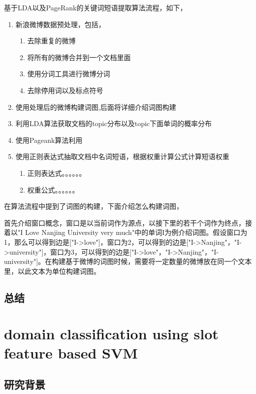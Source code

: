 \documentclass[master]{njuthesis}
\begin{document}
    基于LDA以及PageRank的关键词短语提取算法流程，如下，
    \begin{enumerate}
       \item 新浪微博数据预处理，包括，
	 \begin{enumerate}
	    \item 去除重复的微博
	    \item 将所有的微博合并到一个文档里面
	    \item 使用分词工具进行微博分词
	    \item 去除停用词以及标点符号
         \end{enumerate}
       \item 使用处理后的微博构建词图,后面将详细介绍词图构建
       \item 利用LDA算法获取文档的topic分布以及topic下面单词的概率分布
       \item 使用Pageank算法利用
       \item 使用正则表达式抽取文档中名词短语，根据权重计算公式计算短语权重
	 \begin{enumerate}
	   \item 正则表达式。。。。。。
	   \item 权重公式。。。。。。
         \end{enumerate}
    \end{enumerate}
    
    在算法流程中提到了词图的构建，下面介绍怎么构建词图，

    首先介绍窗口概念，窗口是以当前词作为源点，以接下里的若干个词作为终点，接着以"I Love Nanjing University very much"中的单词I为例介绍词图。假设窗口为1，那么可以得到边是["I->love"]，窗口为2，可以得到的边是["I->Nanjing"，"I->university"]，窗口为3，可以得到的边是["I->love"，"I->Nanjing"，"I-university"]。在构建基于微博的词图时候，需要将一定数量的微博放在同一个文本里，以此文本为单位构建词图。


\section{总结}

\chapter{domain classification using slot feature based SVM}\label{chapter_smallworld}

\section{研究背景}
\end{document}
